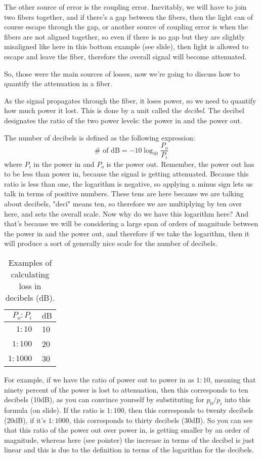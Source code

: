 The other source of error is the coupling error. Inevitably, we will have to join two fibers together, and if there's a gap between the fibers, then the light can of course escape through the gap, or another source of coupling error is when the fibers are not aligned together, so even if there is no gap but they are slightly misaligned like here in this bottom example (see slide), then light is allowed to escape and leave the fiber, therefore the overall signal will become attenuated.

So, those were the main sources of losses, now we're going to discuss how to quantify the attenuation in a fiber.

As the signal propagates through the fiber, it loses power, so we need to quantify how much power it lost. This is done by a unit called the \emph{decibel}. The decibel designates the ratio of the two power levels: the power in and the power out.

The number of decibels is defined as the following expression:
\begin{equation}
\# \text { of } \mathrm{dB}=-10 \log _{10} \frac{P_o}{P_i}
\end{equation}
where $P_i$ in the power in and $P_o$ is the power out. Remember, the power out has to be less than power in, because the signal is getting attenuated.  Because this ratio is less than one, the logarithm is negative, so applying a minus sign lets us talk in terms of positive numbers. These tens are here because we are talking about decibels, "deci" means ten, so therefore we are multiplying by ten over here, and sets the overall scale. Now why do we have this logarithm here? And that's because we will be considering a large span of orders of magnitude between the power in and the power out, and therefore if we take the logarithm, then it will produce a sort of generally nice scale for the number of decibels.
\begin{table}
\begin{tabular}{r|c}
$P_o: P_i$ & $\mathrm{~dB}$ \\
\hline $1: 10$ & 10 \\
$1: 100$ & 20 \\
$1: 1000$ & 30
\end{tabular}
\caption{Examples of calculating loss in decibels (dB).}
\label{tab:decibels}
\end{table}

For example, if we have the ratio of power out to power in as $1:10$, meaning that ninety percent of the power is lost to attenuation, then this corresponds to ten decibels (10dB), as you can convince yourself by substituting for $p_0/p_i$ into this formula (on slide). If the ratio is $1:100$, then this corresponds to twenty decibels (20dB), if it's $1:1000$, this corresponds to thirty decibels (30dB). So you can see that this ratio of the power out over power in, is getting smaller by an order of magnitude, whereas here (see pointer) the increase in terms of the decibel is just linear and this is due to the definition in terms of the logarithm for the decibels.

